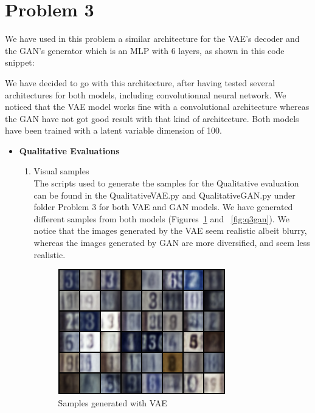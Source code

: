\section*{Problem 3}
We have used in this problem a similar architecture for the VAE's decoder and the GAN's generator which is an MLP with 6 layers, as shown in this code snippet:


We have decided to go with this architecture, after having tested several architectures for both models, including convolutionnal neural network. We noticed that the VAE model works fine with a convolutional architecture whereas the GAN have not got good result with that kind of architecture. Both models have been trained with a latent variable dimension of 100.

\begin{itemize}
\item[A.] {\textbf{Qualitative Evaluations}}\\
\begin{enumerate}
	\item[1.]{Visual samples}\\
	The scripts used to generate the samples for the Qualitative evaluation can be found in the QualitativeVAE.py and QualitativeGAN.py under folder Problem 3 for both VAE and GAN models. 
	We have generated different samples from both models (Figures~\ref{fig:q3vae} and ~\ref{fig:q3gan}). We notice that the images generated by the VAE seem realistic albeit blurry, whereas the images generated by GAN are more diversified, and seem less realistic. 
	\begin{figure}[H]
		\centering
		\includegraphics[scale=1]{Q3vaesample.png}
		\caption{Samples generated with VAE}
		\label{fig:q3vae}
	\end{figure}
	

\end{enumerate}
\end{itemize}
